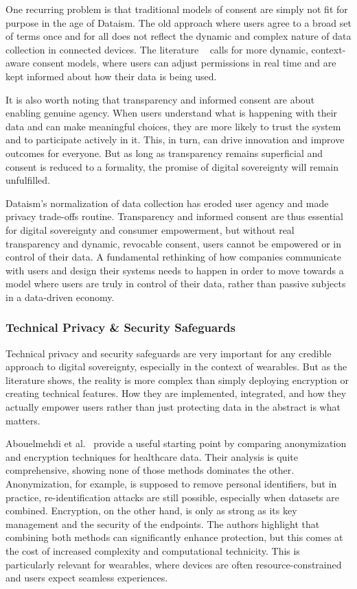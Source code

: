 	One recurring problem is that traditional models of consent are simply not fit for purpose in the age of Dataism. The old approach where users agree to a broad set of terms once and for all does not reflect the dynamic and complex nature of data collection in connected devices. The literature ~\cite{Safavi2014} calls for more dynamic, context-aware consent models, where users can adjust permissions in real time and are kept informed about how their data is being used.

	It is also worth noting that transparency and informed consent are about enabling genuine agency. When users understand what is happening with their data and can make meaningful choices, they are more likely to trust the system and to participate actively in it. This, in turn, can drive innovation and improve outcomes for everyone. But as long as transparency remains superficial and consent is reduced to a formality, the promise of digital sovereignty will remain unfulfilled.

	Dataism’s normalization of data collection has eroded user agency and made privacy trade-offs routine.
	Transparency and informed consent are thus essential for digital sovereignty and consumer empowerment, but without real transparency and dynamic, revocable consent, users cannot be empowered or in control of their data. A fundamental rethinking of how companies communicate with users and design their systems needs to happen in order to move towards a model where users are truly in control of their data, rather than passive subjects in a data-driven economy.
	\subsubsection{Technical Privacy \& Security Safeguards}

	Technical privacy and security safeguards are very important for any credible approach to digital sovereignty, especially in the context of wearables. But as the literature shows, the reality is more complex than simply deploying encryption or creating technical features. How they are implemented, integrated, and how they actually empower users rather than just protecting data in the abstract is what matters.

	Abouelmehdi et al.~\cite{Abouelmehdi2018} provide a useful starting point by comparing anonymization and encryption techniques for healthcare data. Their analysis is quite comprehensive, showing none of those methods dominates the other. Anonymization, for example, is supposed to remove personal identifiers, but in practice, re-identification attacks are still possible, especially when datasets are combined. Encryption, on the other hand, is only as strong as its key management and the security of the endpoints. The authors highlight that combining both methods can significantly enhance protection, but this comes at the cost of increased complexity and computational technicity. This is particularly relevant for wearables, where devices are often resource-constrained and users expect seamless experiences.

